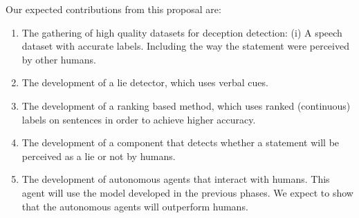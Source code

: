 Our expected contributions from this proposal are:
\begin{enumerate}
	\item The gathering of high quality datasets for deception detection:
	(i) A speech dataset with accurate labels. Including the way the statement were perceived by other humans. 
	\item The development of a lie detector, which uses verbal cues.
	\item The development of a ranking based method, which uses ranked (continuous) labels on sentences in order to achieve higher accuracy.
	\item The development of a component that detects whether a statement will be perceived as a lie or not by humans.
	\item The development of autonomous agents that interact with humans. This agent will use the model developed in the previous phases. We expect to show that the autonomous agents will outperform humans.
\end{enumerate}